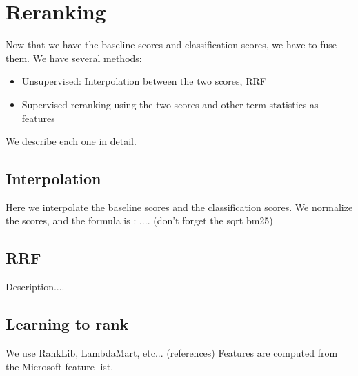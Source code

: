 \section{Reranking}
Now that we have the baseline scores and classification scores, we have to fuse them. We have several methods:
\begin{itemize}
 \item Unsupervised: Interpolation between the two scores, RRF
 \item Supervised reranking using the two scores and other term statistics as features
\end{itemize}

We describe each one in detail.
\subsection{Interpolation}
Here we interpolate the baseline scores and the classification scores.
We normalize the scores, and the formula is : .... (don't forget the sqrt bm25)

\subsection{RRF}
Description....

\subsection{Learning to rank}
We use RankLib, LambdaMart, etc... (references) Features are computed from the Microsoft feature list.

